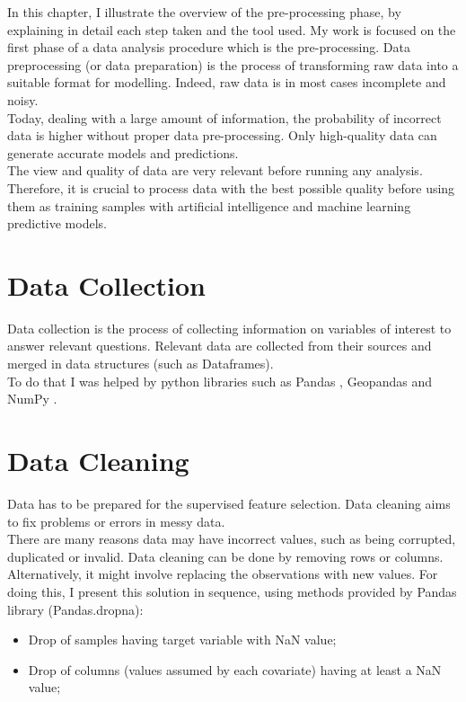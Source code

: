 In this chapter, I illustrate the overview of the pre-processing phase, by explaining in detail each step taken and the tool used.
My work is focused on the first phase of a data analysis procedure which is the pre-processing.
Data preprocessing (or data preparation) is the process of transforming raw data into a suitable format for modelling. 
Indeed, raw data is in most cases incomplete and noisy.\\
Today, dealing with a large amount of information, the probability of incorrect data is higher without proper data pre-processing.
Only high-quality data can generate accurate models and predictions. \\
The view and quality of data are very relevant before running any analysis.\\
Therefore, it is crucial to process data with the best possible quality before using them as training samples with artificial intelligence and machine learning predictive models.\par

\section{Data Collection}
Data collection is the process of collecting information on variables of interest to answer relevant questions. \newline
Relevant data are collected from their sources and merged in data structures (such as Dataframes). \\
To do that I was helped by python libraries such as Pandas \cite{pandas}, Geopandas \cite{geopandas} and NumPy \cite{numpy}.
\section{Data Cleaning}
\label{sec:Data cleaning}
Data has to be prepared for the supervised feature selection.
Data cleaning aims to fix problems or errors in messy data.\\ There are many reasons data may have incorrect values, such as being corrupted, duplicated or invalid. \newline
Data cleaning can be done by removing rows or columns. Alternatively, it might involve replacing the observations with new values. \newline
For doing this, I present this solution in sequence, using methods provided by Pandas library (Pandas.dropna):
\begin{itemize}
\item Drop of samples having target variable with NaN value;
\item Drop of columns (values assumed by each covariate) having at least a NaN value;
\end{itemize}
